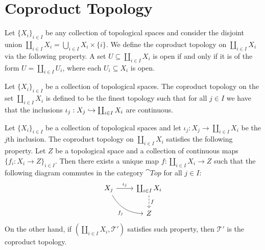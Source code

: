 \section{Coproduct Topology}

\begin{definition}
  Let \(\{X_i\}_{i \in I}\) be any collection of topological spaces and consider
  the disjoint union \(\coprod_{i \in I} X_i = \bigcup_{i \in  I} X_i \times
  \{i\}\). We define the coproduct topology on \(\coprod_{i \in I} X_i\) via the
  following property. A set \(U \subseteq \coprod_{i \in I} X_i\) is open if and
  only if it is of the form \(U = \coprod_{i \in I} U_i\), where each \(U_i
  \subseteq X_i\) is open.
\end{definition}

\begin{definition}\label{def: coproduct top}
  Let \(\{X_i\}_{i \in I}\) be a collection of topological spaces. The coproduct
  topology on the set \(\coprod_{i \in I} X_i\) is defined to be the finest
  topology such that for all \(j \in I\) we have that the inclusions \(\iota_j:
  X_j \hookrightarrow \coprod_{i \in I} X_i\) are continuous.
\end{definition}

\begin{theorem}
  \label{thm: coprod top universal property}
  Let \(\{X_i\}_{i \in I}\) be a collection of topological spaces and let
  \(\iota_j: X_j \to \coprod_{i \in I} X_i\) be the \(j\)th inclusion. The
  coproduct topology on \(\coprod_{i \in I} X_i\) satisfies the following
  property. Let \(Z\) be a topological space and a collection of continuous maps 
  \(\{f_i: X_i \to Z\}_{i \in I}\). Then there exists a unique map \(f:
  \coprod_{i \in I} X_i \to Z\) such that the following diagram commutes in the
  category \(\cat{Top}\) for all \(j \in I\):
  \[
    \begin{tikzcd}
      X_j \ar[r, "\iota_j"]  \ar[rd, swap, bend right, "f_j"]
      & \coprod_{i \in I} X_i \ar[d, dashed, "f"] \\ &Z
    \end{tikzcd}
  \] 
  On the other hand, if \((\coprod_{i \in I} X_i, \mathcal T')\) satisfies such
  property, then \(\mathcal T'\) is the coproduct topology.
\end{theorem}

